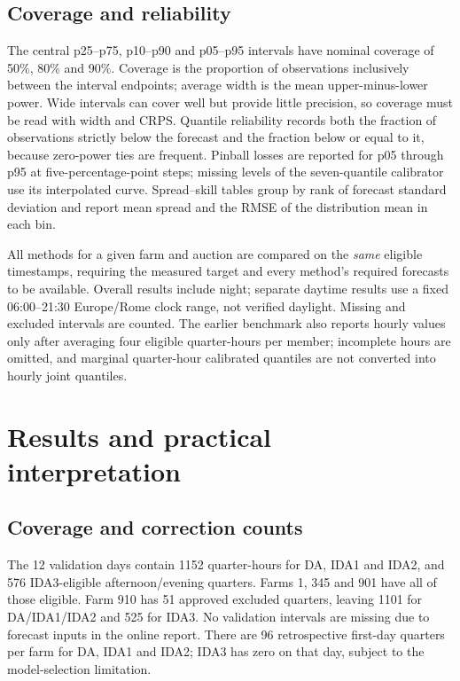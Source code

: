 \documentclass[11pt,a4paper]{article}
\begin{document}
\subsection{Coverage and reliability}
The central p25--p75, p10--p90 and p05--p95 intervals have nominal coverage of 50\%, 80\% and 90\%. Coverage is the proportion of observations inclusively between the interval endpoints; average width is the mean upper-minus-lower power. Wide intervals can cover well but provide little precision, so coverage must be read with width and CRPS. Quantile reliability records both the fraction of observations strictly below the forecast and the fraction below or equal to it, because zero-power ties are frequent. Pinball losses are reported for p05 through p95 at five-percentage-point steps; missing levels of the seven-quantile calibrator use its interpolated curve. Spread--skill tables group by rank of forecast standard deviation and report mean spread and the RMSE of the distribution mean in each bin.

All methods for a given farm and auction are compared on the \emph{same} eligible timestamps, requiring the measured target and every method's required forecasts to be available. Overall results include night; separate daytime results use a fixed 06:00--21:30 Europe/Rome clock range, not verified daylight. Missing and excluded intervals are counted. The earlier benchmark also reports hourly values only after averaging four eligible quarter-hours per member; incomplete hours are omitted, and marginal quarter-hour calibrated quantiles are not converted into hourly joint quantiles.

\section{Results and practical interpretation}\label{sec:results}
\subsection{Coverage and correction counts}
The 12 validation days contain 1152 quarter-hours for DA, IDA1 and IDA2, and 576 IDA3-eligible afternoon/evening quarters. Farms 1, 345 and 901 have all of those eligible. Farm 910 has 51 approved excluded quarters, leaving 1101 for DA/IDA1/IDA2 and 525 for IDA3. No validation intervals are missing due to forecast inputs in the online report. There are 96 retrospective first-day quarters per farm for DA, IDA1 and IDA2; IDA3 has zero on that day, subject to the model-selection limitation.
\end{document}

